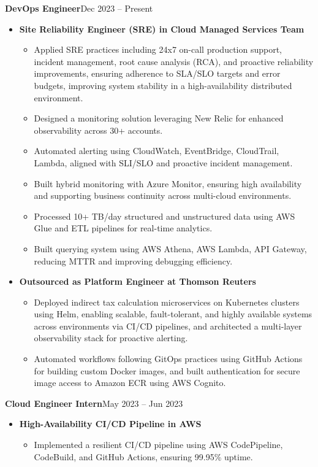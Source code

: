 \documentclass[a4paper,10.999999pt]{article}
\newenvironment{joblong}[2]
        {
        \noindent\textbf{#1}\hfill{#2}\par
        \vspace{0.3pt}
        \begin{minipage}[t]{\linewidth}
        \begin{itemize}[after=\strut, topsep=0.3pt, partopsep=0pt, parsep=0pt, leftmargin=0.5em, itemsep=0.35pt, label=\raisebox{0.2ex}{\tiny$\circ$}]
        }
        {
        \end{itemize}
        \end{minipage}
        \vspace{0.5pt}
        }
\begin{document}
    \begin{joblong}{DevOps Engineer}{Dec 2023 -- Present}
    Intuitive.Cloud
    \item \textbf{Site Reliability Engineer (SRE) in Cloud Managed Services Team}
    \begin{itemize}
    \item Applied SRE practices including 24x7 on-call production support, incident management, root cause analysis (RCA), and proactive reliability improvements, ensuring adherence to SLA/SLO targets and error budgets, improving system stability in a high-availability distributed environment.
    \item Designed a monitoring solution leveraging New Relic for enhanced observability across 30+ accounts.
    \item Automated alerting using CloudWatch, EventBridge, CloudTrail, Lambda, aligned with SLI/SLO and proactive incident management.
    \item Built hybrid monitoring with Azure Monitor, ensuring high availability and supporting business continuity across multi-cloud environments.
    \item Processed 10+ TB/day structured and unstructured data using AWS Glue and ETL pipelines for real-time analytics.
    \item Built querying system using AWS Athena, AWS Lambda, API Gateway, reducing MTTR and improving debugging efficiency.
    \end{itemize}
    \vspace{0.5pt}

    \item \textbf{Outsourced as Platform Engineer at Thomson Reuters}
    \begin{itemize}
    \item Deployed indirect tax calculation microservices on Kubernetes clusters using Helm, enabling scalable, fault-tolerant, and highly available systems across environments via CI/CD pipelines, and architected a multi-layer observability stack for proactive alerting.
    \item Automated workflows following GitOps practices using GitHub Actions for building custom Docker images, and built authentication for secure image access to Amazon ECR using AWS Cognito.
    \end{itemize}
    \end{joblong}

    \begin{joblong}{Cloud Engineer Intern}{May 2023 -- Jun 2023}
    Mactores Innovation
    \item \textbf{High-Availability CI/CD Pipeline in AWS}
    \begin{itemize}
    \item Implemented a resilient CI/CD pipeline using AWS CodePipeline, CodeBuild, and GitHub Actions, ensuring 99.95\% uptime.
    \end{itemize}
    \end{joblong}
\end{document}
